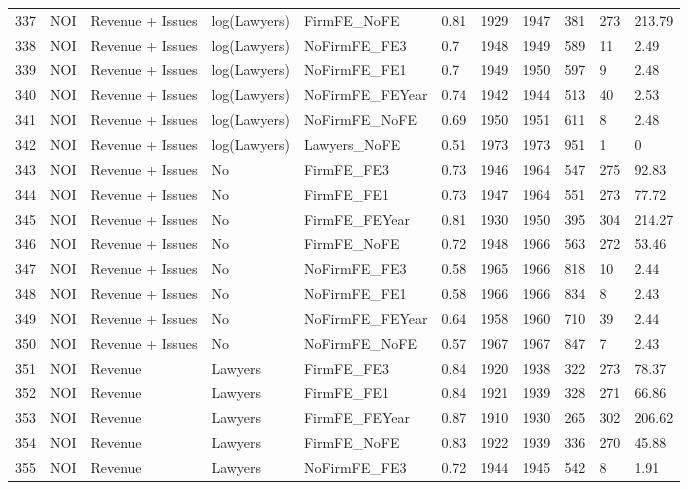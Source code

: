 \begin{table}[ht]
\begin{tabular}{rllllllllll}
  337 & NOI & Revenue + Issues & log(Lawyers) & FirmFE\_NoFE & 0.81 & 1929 & 1947 & 381 & 273 & 213.79 \\ 
  338 & NOI & Revenue + Issues & log(Lawyers) & NoFirmFE\_FE3 & 0.7 & 1948 & 1949 & 589 & 11 & 2.49 \\ 
  339 & NOI & Revenue + Issues & log(Lawyers) & NoFirmFE\_FE1 & 0.7 & 1949 & 1950 & 597 & 9 & 2.48 \\ 
  340 & NOI & Revenue + Issues & log(Lawyers) & NoFirmFE\_FEYear & 0.74 & 1942 & 1944 & 513 & 40 & 2.53 \\ 
  341 & NOI & Revenue + Issues & log(Lawyers) & NoFirmFE\_NoFE & 0.69 & 1950 & 1951 & 611 & 8 & 2.48 \\ 
  342 & NOI & Revenue + Issues & log(Lawyers) & Lawyers\_NoFE & 0.51 & 1973 & 1973 & 951 & 1 & 0 \\ 
  343 & NOI & Revenue + Issues & No & FirmFE\_FE3 & 0.73 & 1946 & 1964 & 547 & 275 & 92.83 \\ 
  344 & NOI & Revenue + Issues & No & FirmFE\_FE1 & 0.73 & 1947 & 1964 & 551 & 273 & 77.72 \\ 
  345 & NOI & Revenue + Issues & No & FirmFE\_FEYear & 0.81 & 1930 & 1950 & 395 & 304 & 214.27 \\ 
  346 & NOI & Revenue + Issues & No & FirmFE\_NoFE & 0.72 & 1948 & 1966 & 563 & 272 & 53.46 \\ 
  347 & NOI & Revenue + Issues & No & NoFirmFE\_FE3 & 0.58 & 1965 & 1966 & 818 & 10 & 2.44 \\ 
  348 & NOI & Revenue + Issues & No & NoFirmFE\_FE1 & 0.58 & 1966 & 1966 & 834 & 8 & 2.43 \\ 
  349 & NOI & Revenue + Issues & No & NoFirmFE\_FEYear & 0.64 & 1958 & 1960 & 710 & 39 & 2.44 \\ 
  350 & NOI & Revenue + Issues & No & NoFirmFE\_NoFE & 0.57 & 1967 & 1967 & 847 & 7 & 2.43 \\ 
  351 & NOI & Revenue & Lawyers & FirmFE\_FE3 & 0.84 & 1920 & 1938 & 322 & 273 & 78.37 \\ 
  352 & NOI & Revenue & Lawyers & FirmFE\_FE1 & 0.84 & 1921 & 1939 & 328 & 271 & 66.86 \\ 
  353 & NOI & Revenue & Lawyers & FirmFE\_FEYear & 0.87 & 1910 & 1930 & 265 & 302 & 206.62 \\ 
  354 & NOI & Revenue & Lawyers & FirmFE\_NoFE & 0.83 & 1922 & 1939 & 336 & 270 & 45.88 \\ 
  355 & NOI & Revenue & Lawyers & NoFirmFE\_FE3 & 0.72 & 1944 & 1945 & 542 & 8 & 1.91 \\ 

\end{tabular}
\end{table}
